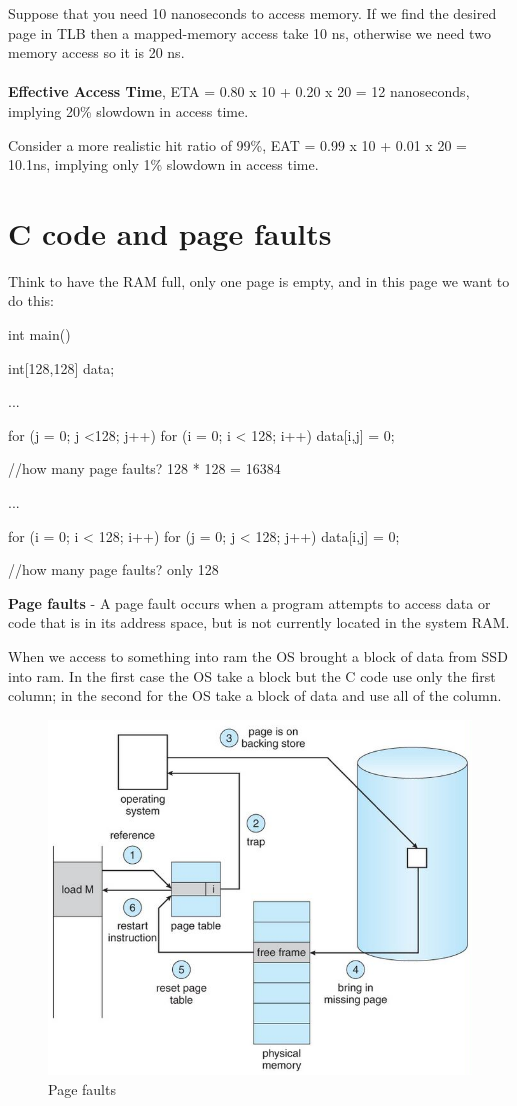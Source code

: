 Suppose that you need 10 nanoseconds to access memory. If we find the desired page in TLB then a mapped-memory access take 10 ns, otherwise we need two memory access so it is 20 ns.

\paragraph{}
\textbf{Effective Access Time}, ETA = 0.80 x 10 + 0.20 x 20 = 12 nanoseconds, implying 20\% slowdown in access time.

Consider a more realistic hit ratio of 99\%, EAT = 0.99 x 10 + 0.01 x 20 = 10.1ns, implying only 1\% slowdown in access time.

\newpage
\section{C code and page faults}

Think to have the RAM full, only one page is empty, and in this page we want to do this:

\begin{codeInC}
int main(){
    int[128,128] data;

    ...

    for (j = 0; j <128; j++)
        for (i = 0; i < 128; i++)
            data[i,j] = 0;
 
    //how many page faults? 128 * 128 = 16384

    ...

    for (i = 0; i < 128; i++)
        for (j = 0; j < 128; j++)
            data[i,j] = 0;

    //how many page faults? only 128

}   
\end{codeInC}

\textbf{Page faults} - A page fault occurs when a program attempts to access data or code that is in its address space, but is not currently located in the system RAM.

When we access to something into ram the OS brought a block of data from SSD into ram. In the first case the OS take a block but the C code use only the first column; in the second for the OS take a block of data and use all of the column.


\begin{figure}[htbp]
    \centering
    \includegraphics[width=0.65\linewidth]{img/bnetg.png}
    \caption{Page faults}
\end{figure}


